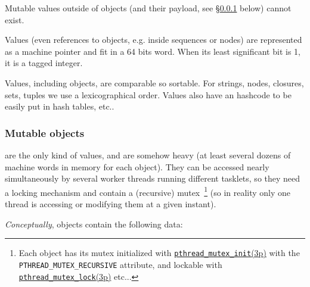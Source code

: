 Mutable values outside of objects (and their payload, see
§\ref{subsubsec:objects} below) cannot exist.

Values (even references to objects, e.g. inside sequences or nodes)
are represented as a machine pointer and fit in a 64 bits word. When
its least significant bit is 1, it is a tagged integer.

Values, including objects, are comparable so sortable. For strings,
nodes, closures, sets, tuples we use a lexicographical order. Values
also have an hashcode to be easily put in hash tables, etc..

\subsubsection{Mutable objects}
\label{subsubsec:objects}

 are the only kind of 
values, and are somehow heavy (at least several dozens of machine words
in memory for each object). They can be accessed nearly simultaneously
by several worker threads running different tasklets, so they need a
locking mechanism and contain a (recursive) mutex~\footnote{Each
  object has its mutex initialized with
  \href{http://man7.org/linux/man-pages/man3/pthread\_mutex\_init.3p.html}{\texttt{pthread\_mutex\_init}(3p)}
  with the \texttt{PTHREAD\_MUTEX\_RECURSIVE} attribute, and lockable
  with
  \href{http://man7.org/linux/man-pages/man3/pthread\_mutex\_lock.3p.html}{\texttt{pthread\_mutex\_lock}(3p)}
  etc...} (so in reality only one thread is accessing or modifying
them at a given instant).

\medskip

\emph{Conceptually}, objects contain the following data:

